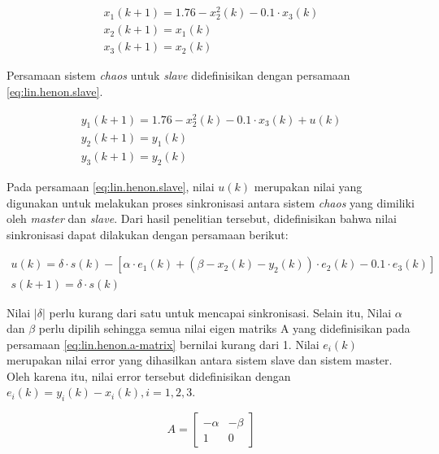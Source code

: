 \begin{equation}
  \label{eq:lin.henon.master}
  \begin{array}{l}   
    x_1(k+1) = 1.76 - x_2^2(k) - 0.1 \cdot x_3(k)\\
    x_2(k+1) = x_1(k)\\
    x_3(k+1) = x_2(k)
  \end{array}
\end{equation}

Persamaan sistem \emph{chaos} untuk \emph{slave} didefinisikan dengan persamaan \ref{eq:lin.henon.slave}.

\begin{equation}
  \label{eq:lin.henon.slave}
  \begin{array}{l}   
    y_1(k+1) = 1.76 - x_2^2(k) - 0.1 \cdot x_3(k) + u(k)\\
    y_2(k+1) = y_1(k)\\
    y_3(k+1) = y_2(k)
  \end{array}
\end{equation}

Pada persamaan \ref{eq:lin.henon.slave}, nilai $u(k)$ merupakan nilai yang digunakan untuk melakukan proses sinkronisasi antara sistem \emph{chaos} yang dimiliki oleh \emph{master} dan \emph{slave}. Dari hasil penelitian tersebut, didefinisikan bahwa nilai sinkronisasi dapat dilakukan dengan persamaan berikut:

\begin{equation}
  \label{eq:lin.henon.sync}
  \begin{array}{l}   
    u(k) = \delta \cdot s(k) - [\alpha \cdot e_1(k) + (\beta - x_2(k) - y_2(k)) \cdot e_2(k) - 0.1 \cdot e_3(k)]\\
    s(k+1) = \delta \cdot s(k)
  \end{array}
\end{equation}

Nilai $|\delta|$ perlu kurang dari satu untuk mencapai sinkronisasi. Selain itu, Nilai $\alpha$ dan $\beta$ perlu dipilih sehingga semua nilai eigen matriks A yang didefinisikan pada persamaan \ref{eq:lin.henon.a-matrix} bernilai kurang dari 1. Nilai $e_i(k)$ merupakan nilai error yang dihasilkan antara sistem slave dan sistem master. Oleh karena itu, nilai error tersebut didefinisikan dengan $e_i(k) = y_i(k) - x_i(k), i = 1,2,3$.

\begin{equation}
\label{eq:lin.henon.a-matrix}
A = \begin{bmatrix}
  -\alpha & -\beta \\
  1 & 0 
  \end{bmatrix}
\end{equation}

